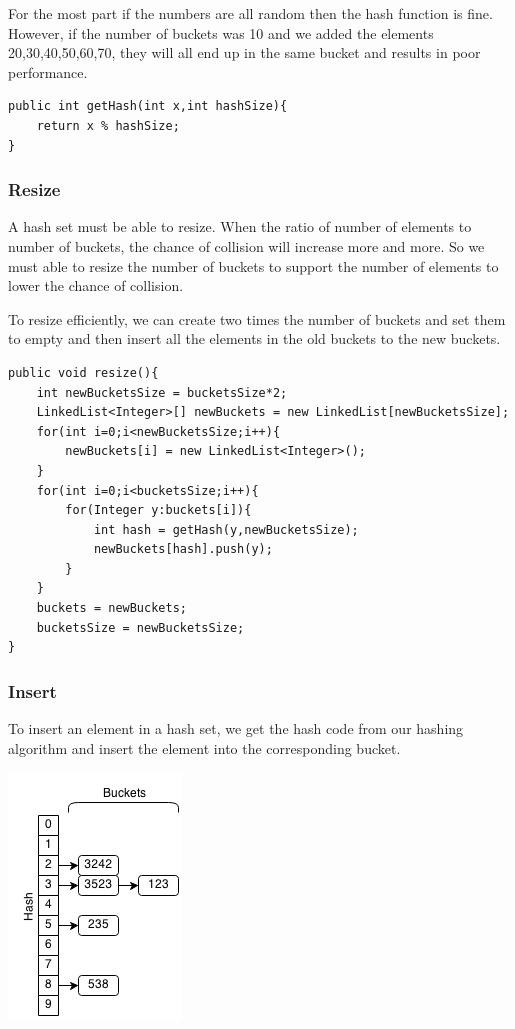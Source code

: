 \documentclass[11pt,oneside]{book}
\makeatletter
\def\maxwidth#1{\ifdim\Gin@nat@width>#1 #1\else\Gin@nat@width\fi}
\makeatother
\begin{document}
For the most part if the numbers are all random then the hash function is fine. However, if the number of buckets was 10 and we added the elements 20,30,40,50,60,70, they will all end up in the same bucket and results in poor performance.

\begin{lstlisting}
public int getHash(int x,int hashSize){
    return x % hashSize;
}
\end{lstlisting}

\subsubsection{Resize}

A hash set must be able to resize. When the ratio of number of elements to number of buckets, the chance of collision will increase more and more. So we must able to resize the number of buckets to support the number of elements to lower the chance of collision.

To resize efficiently, we can create two times the number of buckets and set them to empty and then insert all the elements in the old buckets to the new buckets.

\begin{lstlisting}
public void resize(){
    int newBucketsSize = bucketsSize*2;
    LinkedList<Integer>[] newBuckets = new LinkedList[newBucketsSize];
    for(int i=0;i<newBucketsSize;i++){
        newBuckets[i] = new LinkedList<Integer>();
    }
    for(int i=0;i<bucketsSize;i++){
        for(Integer y:buckets[i]){
            int hash = getHash(y,newBucketsSize);
            newBuckets[hash].push(y);
        }
    }
    buckets = newBuckets;
    bucketsSize = newBucketsSize;
}
\end{lstlisting}

\subsubsection{Insert}

To insert an element in a hash set, we get the hash code from our hashing algorithm and insert the element into the corresponding bucket.

\includegraphics[width=\maxwidth{\textwidth}]{hashset.png}
\end{document}
